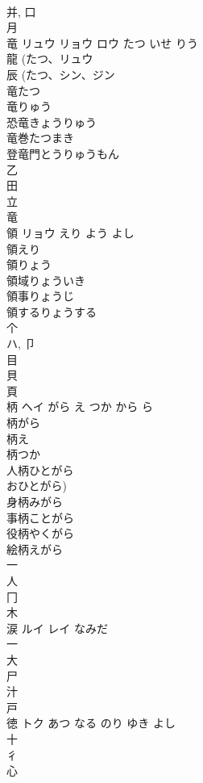 \documentclass[8pt]{extreport}
\begin{document}
\begin{CJK}{UTF8}{min}
\\	并, 口 
\\	月 
\\	竜	リュウ リョウ ロウ	たつ いせ りう	
\\	龍 (たつ、リュウ 
\\	辰 (たつ、シン、ジン 
\\	竜たつ 
\\	竜りゅう 
\\	恐竜きょうりゅう 
\\	竜巻たつまき 
\\	登竜門とうりゅうもん 
\\	乙 
\\	田 
\\	立 
\\	竜 
\\	領	リョウ	えり よう よし	
\\	領えり 
\\	領りょう 
\\	領域りょういき 
\\	領事りょうじ 
\\	領するりょうする 
\\	个 
\\	ハ, 卩 
\\	目 
\\	貝 
\\	頁 
\\	柄	ヘイ	がら え つか から ら	
\\	柄がら
\\	柄え
\\	柄つか
\\	人柄ひとがら
\\	おひとがら) 
\\	身柄みがら
\\	事柄ことがら
\\	役柄やくがら
\\	絵柄えがら
\\	一 
\\	人 
\\	冂 
\\	木 
\\	涙	ルイ レイ	なみだ	
\\	一 
\\	大 
\\	尸 
\\	汁 
\\	戸 
\\	徳	トク	あつ なる のり ゆき よし	
\\	十 
\\	彳 
\\	心 

\end{CJK}
\end{document}
